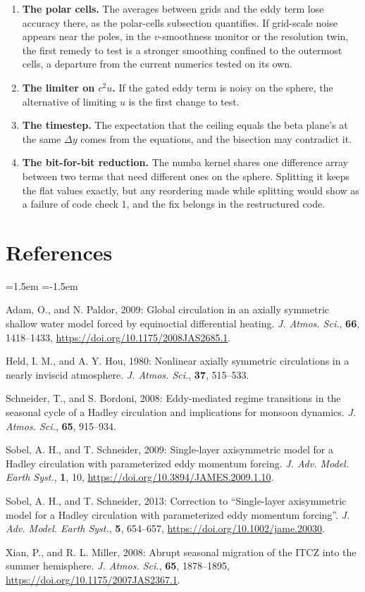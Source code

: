 \documentclass[11pt]{article}
\begin{document}
\begin{enumerate}
\item \textbf{The polar cells.} The averages between grids and the eddy term
  lose accuracy there, as the polar-cells subsection quantifies. If grid-scale
  noise appears near the poles, in the $v$-smoothness monitor or the
  resolution twin, the first remedy to test is a stronger smoothing confined
  to the outermost cells, a departure from the current numerics tested on its
  own.
\item \textbf{The limiter on $c^2u$.} If the gated eddy term is noisy on the
  sphere, the alternative of limiting $u$ is the first change to test.
\item \textbf{The timestep.} The expectation that the ceiling equals the beta
  plane's at the same $\Delta y$ comes from the equations, and the bisection
  may contradict it.
\item \textbf{The bit-for-bit reduction.} The numba kernel shares one
  difference array between two terms that need different ones on the sphere.
  Splitting it keeps the flat values exactly, but any reordering made while
  splitting would show as a failure of code check 1, and the fix belongs in the
  restructured code.
\end{enumerate}

\section*{References}

\begin{list}{}{\leftmargin=1.5em \itemindent=-1.5em \itemsep=2pt}
\item Adam, O., and N. Paldor, 2009: Global circulation in an axially symmetric
  shallow water model forced by equinoctial differential heating.
  \emph{J. Atmos. Sci.}, \textbf{66}, 1418--1433,
  \url{https://doi.org/10.1175/2008JAS2685.1}.
\item Held, I. M., and A. Y. Hou, 1980: Nonlinear axially symmetric
  circulations in a nearly inviscid atmosphere. \emph{J. Atmos. Sci.},
  \textbf{37}, 515--533.
\item Schneider, T., and S. Bordoni, 2008: Eddy-mediated regime transitions in
  the seasonal cycle of a Hadley circulation and implications for monsoon
  dynamics. \emph{J. Atmos. Sci.}, \textbf{65}, 915--934.
\item Sobel, A. H., and T. Schneider, 2009: Single-layer axisymmetric model for
  a Hadley circulation with parameterized eddy momentum forcing. \emph{J. Adv.
  Model. Earth Syst.}, \textbf{1}, 10,
  \url{https://doi.org/10.3894/JAMES.2009.1.10}.
\item Sobel, A. H., and T. Schneider, 2013: Correction to ``Single-layer
  axisymmetric model for a Hadley circulation with parameterized eddy momentum
  forcing''. \emph{J. Adv. Model. Earth Syst.}, \textbf{5}, 654--657,
  \url{https://doi.org/10.1002/jame.20030}.
\item Xian, P., and R. L. Miller, 2008: Abrupt seasonal migration of the ITCZ
  into the summer hemisphere. \emph{J. Atmos. Sci.}, \textbf{65}, 1878--1895,
  \url{https://doi.org/10.1175/2007JAS2367.1}.
\end{list}
\end{document}

